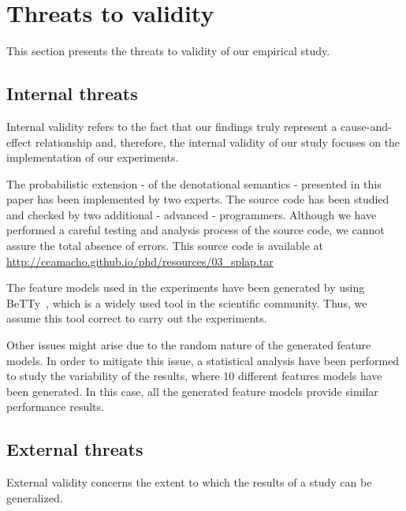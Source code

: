 \section{Threats to validity}
\label{section_threats}

This section presents the threats to validity of our empirical study.

\subsection{Internal threats}

Internal validity refers to the fact that our findings truly represent a cause-and-effect relationship and, therefore, the internal validity of our study focuses on the implementation of our experiments.

The probabilistic extension - of the denotational semantics - presented in this paper has been implemented by two experts. The source code has been studied and checked by two additional - advanced - programmers. Although we have performed a careful testing and analysis process of the source code, we cannot assure the total absence of errors. This source code is available at \url{http://ccamacho.github.io/phd/resources/03_splap.tar}

The feature models used in the experiments have been generated by using BeTTy~\cite{sg12}, which is a widely used tool in the scientific community. Thus, we assume this tool correct to carry out the experiments.

Other issues might arise due to the random nature of the generated feature models. In order to mitigate this issue, a statistical analysis have been performed to study the variability of the results, where 10 different features models have been generated. In this case, all the generated feature models provide similar performance results.

\subsection{External threats}

External validity concerns the extent to which the results of a study can be generalized.

